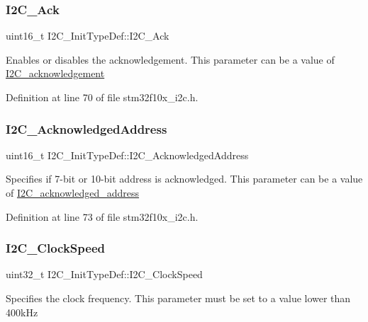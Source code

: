 \subsubsection{\texorpdfstring{I2\+C\+\_\+\+Ack}{I2C\_Ack}}
{\footnotesize\ttfamily uint16\+\_\+t I2\+C\+\_\+\+Init\+Type\+Def\+::\+I2\+C\+\_\+\+Ack}

Enables or disables the acknowledgement. This parameter can be a value of \hyperlink{group___i2_c__acknowledgement}{I2\+C\+\_\+acknowledgement} 

Definition at line 70 of file stm32f10x\+\_\+i2c.\+h.

\mbox{\label{struct_i2_c___init_type_def_a300e847972f50b0d25c4f13be5d93d79}} 
\subsubsection{\texorpdfstring{I2\+C\+\_\+\+Acknowledged\+Address}{I2C\_AcknowledgedAddress}}
{\footnotesize\ttfamily uint16\+\_\+t I2\+C\+\_\+\+Init\+Type\+Def\+::\+I2\+C\+\_\+\+Acknowledged\+Address}

Specifies if 7-\/bit or 10-\/bit address is acknowledged. This parameter can be a value of \hyperlink{group___i2_c__acknowledged__address}{I2\+C\+\_\+acknowledged\+\_\+address} 

Definition at line 73 of file stm32f10x\+\_\+i2c.\+h.

\mbox{\label{struct_i2_c___init_type_def_a737c289f4515ae4cb642db0412762169}} 
\subsubsection{\texorpdfstring{I2\+C\+\_\+\+Clock\+Speed}{I2C\_ClockSpeed}}
{\footnotesize\ttfamily uint32\+\_\+t I2\+C\+\_\+\+Init\+Type\+Def\+::\+I2\+C\+\_\+\+Clock\+Speed}

Specifies the clock frequency. This parameter must be set to a value lower than 400k\+Hz 

